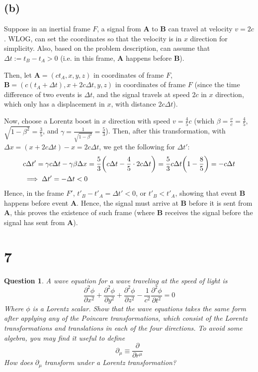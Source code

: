 \documentclass{article}
\newtheorem{question}{Question}
\DeclarePairedDelimiter{\paran}{(}{)}%
\newcommand{\bA}{\textbf{A}}
\newcommand{\bB}{\textbf{B}}
\begin{document}
\subsection*{(b)}
Suppose in an inertial frame $F$, a signal from $\bA$ to $\bB$ can travel at velocity $v=2c$. WLOG, can set the coordinates so that the velocity is in $x$ direction for simplicity. Also, based on the problem description, can assume that $\Delta t:= t_B-t_A >0$ (i.e. in this frame, $\bA$ happens before $\bB$). 

Then, let $\bA = (ct_A, x,y,z)$ in coordinates of frame $F$, $\bB = (c(t_A+\Delta t), x+2c\Delta t, y, z)$ in coordinates of frame $F$ (since the time difference of two events is $\Delta t$, and the signal travels at speed $2c$ in $x$ direction, which only has a displacement in $x$, with distance $2c\Delta t$).

\hfil

Now, choose a Lorentz boost in $x$ direction with speed $v = \frac{4}{5}c$ (which $\beta = \frac{v}{c}=\frac{4}{5}$, $\sqrt{1-\beta^2} = \frac{3}{5}$, and $\gamma = \frac{1}{\sqrt{1-\beta^2}}=\frac{5}{3}$). Then, after this transformation, with $\Delta x = (x+2c\Delta t)-x = 2c\Delta t$, we get the following for $\Delta t'$:
\begin{align}
    &c\Delta t' = \gamma c\Delta t - \gamma\beta \Delta x  = \frac{5}{3}\paran*{c\Delta t - \frac{4}{5}\cdot 2c\Delta t} = \frac{5}{3}c\Delta t\paran*{1-\frac{8}{5}} = -c\Delta t\\
    &\implies \Delta t' = -\Delta t<0
\end{align}
Hence, in the frame $F'$, $t'_B-t'_A = \Delta t' <0$, or $t'_B < t'_A$, showing that event $\bB$ happens before event $\bA$. Hence, the signal must arrive at $\bB$ before it is sent from $\bA$, this proves the existence of such frame (where $\bB$ receives the signal before the signal has sent from $\bA$).

\break

\section*{7}
\begin{question}\label{q7}
    A wave equation for a wave traveling at the speed of light is 
    $$\frac{\partial^2\phi}{\partial x^2}+\frac{\partial^2\phi}{\partial y^2}+\frac{\partial^2\phi}{\partial z^2}-\frac{1}{c^2}\frac{\partial^2\phi}{\partial t^2}=0$$
    Where $\phi$ is a Lorentz scalar. Show that the wave equations takes the same form after applying any of the \emph{Poincare transformations}, which consist of the Lorentz transformations and translations in each of the four directions. To avoid some algebra, you may find it useful to define 
    $$\partial_\mu \equiv \frac{\partial}{\partial r^\mu}$$
    How does $\partial_\mu$ transform under a Lorentz transformation?
\end{question}
\end{document}
